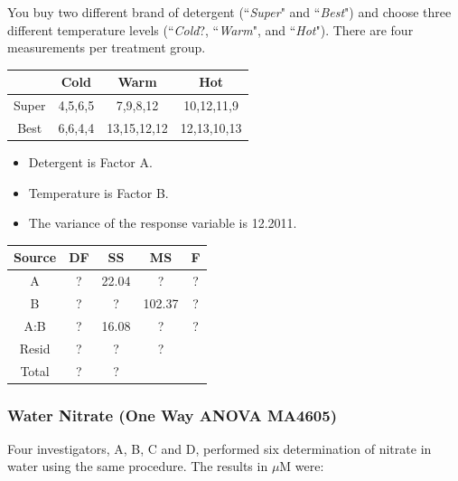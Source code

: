 \documentclass[a4paper,12pt]{article}
\begin{document}
\noindent You buy two different brand of detergent (``\textit{Super}" and ``\textit{Best}") and choose three different temperature levels (``\textit{Cold}?, ``\textit{Warm}", and ``\textit{Hot}"). There are four measurements per treatment group.
{
	\large
	\begin{center}
		\begin{tabular}{|c||c|c|c|}
			\hline
			& Cold & Warm & Hot  \\ \hline \hline
			Super &  4,5,6,5    & 7,9,8,12     &  10,12,11,9    \\  \hline
			Best  &  6,6,4,4    & 13,15,12,12    & 12,13,10,13     \\  \hline
		\end{tabular} 
	\end{center}
}
\begin{itemize}
	\item Detergent is Factor A.
	\item Temperature is Factor B.
	\item The variance of the response variable is 12.2011.
\end{itemize}
{
	\large
	\begin{center}
		\begin{tabular}{|c|c|c|c|c|}\hline
			Source & DF & SS & MS & F \\ \hline
			A  & \phantom{spa}? \phantom{spa}  & 22.04 & \phantom{spa}? \phantom{spa} & \phantom{spa}? \phantom{spa} \\ \hline
			B  &\phantom{spa}? \phantom{spa} & \phantom{spa}? \phantom{spa}  & 102.37 & \phantom{spa}? \phantom{spa} \\ \hline
			A:B  & \phantom{spa}? \phantom{spa}& 16.08 & \phantom{spa}? \phantom{spa} & \phantom{spa}? \phantom{spa} \\ \hline
			Resid & \phantom{spa}? \phantom{spa}& \phantom{spa}? \phantom{spa} & \phantom{spa}? \phantom{spa} & \\ \hline \hline
			Total & \phantom{spa}? \phantom{spa}&\phantom{spa}? \phantom{spa}  & \phantom{spa} & \\  \hline
		\end{tabular} 
	\end{center}
}

\subsubsection*{Water Nitrate (One Way ANOVA MA4605)}
	Four investigators, A, B, C and D, performed six determination of nitrate in water using the same procedure. The results in $\mu$M were:
	
\end{document}
